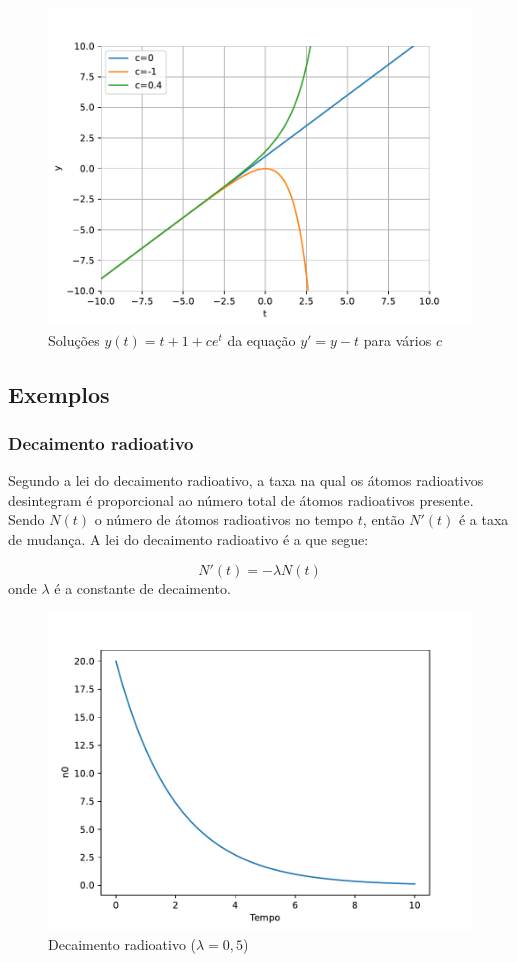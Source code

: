 \begin{figure}[htb!]
	\centering
	\caption{Soluções $y(t) = t + 1 + ce^t$ da equação $y'=y-t$ para vários $c$}
	\label{fig:solucao}
	\includegraphics[width=0.7\linewidth]{figs/solucao}
\end{figure}


\subsection{Exemplos}
\subsubsection{Decaimento radioativo}
Segundo a lei do decaimento radioativo, a taxa na qual os átomos radioativos desintegram é proporcional ao número total de átomos radioativos presente. Sendo $N(t)$ o número de átomos radioativos no tempo $t$, então $N'(t)$ é a taxa de mudança. A lei do decaimento radioativo é a que segue:

$$N'(t) = -\lambda N(t)$$
onde $\lambda$ é a constante de decaimento.

\begin{figure}[htb!]
	\centering
	\caption{Decaimento radioativo ($\lambda = 0,5$)}
	\label{fig:decaimento}
	\includegraphics[width=0.7\linewidth]{figs/decaimento}
\end{figure}


